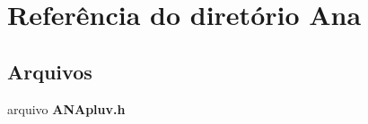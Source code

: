 \section{Referência do diretório Ana}
\label{dir_e1740da71959fde18b90ca0d847ccc09}
\subsection*{Arquivos}
\begin{DoxyCompactItemize}
\item 
arquivo {\bf A\+N\+Apluv.\+h}
\end{DoxyCompactItemize}
